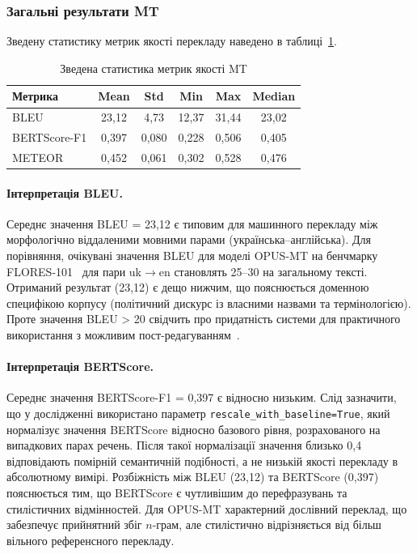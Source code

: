 \subsubsection{Загальні результати MT}

Зведену статистику метрик якості перекладу наведено в таблиці~\ref{tab:mt_summary}.

\begin{table}[H]
\centering
\caption{Зведена статистика метрик якості MT}
\label{tab:mt_summary}
\begin{tabular}{|l|c|c|c|c|c|}
\hline
\textbf{Метрика} & \textbf{Mean} & \textbf{Std} & \textbf{Min} & \textbf{Max} & \textbf{Median} \\
\hline
BLEU & 23,12 & 4,73 & 12,37 & 31,44 & 23,02 \\
BERTScore-F1 & 0,397 & 0,080 & 0,228 & 0,506 & 0,405 \\
METEOR & 0,452 & 0,061 & 0,302 & 0,528 & 0,476 \\
\hline
\end{tabular}
\end{table}

\paragraph{Інтерпретація BLEU.}
Середнє значення BLEU = 23,12 є типовим для машинного перекладу між
морфологічно віддаленими мовними парами (українська--англійська).
Для порівняння, очікувані значення BLEU для моделі OPUS-MT на бенчмарку
FLORES-101~\cite{flores} для пари uk$\to$en становлять 25--30 на
загальному тексті. Отриманий результат (23,12) є дещо нижчим, що
пояснюється доменною специфікою корпусу (політичний дискурс із
власними назвами та термінологією). Проте значення BLEU > 20 свідчить
про придатність системи для практичного використання з можливим
пост-редагуванням~\cite{post_bleu}.

\paragraph{Інтерпретація BERTScore.}
Середнє значення BERTScore-F1 = 0,397 є відносно низьким. Слід зазначити,
що у дослідженні використано параметр \texttt{rescale\_with\_baseline=True},
який нормалізує значення BERTScore відносно базового рівня, розрахованого
на випадкових парах речень. Після такої нормалізації значення близько 0,4
відповідають помірній семантичній подібності, а не низькій якості перекладу
в абсолютному вимірі. Розбіжність між BLEU (23,12) та BERTScore (0,397)
пояснюється тим, що BERTScore є чутливішим до перефразувань та
стилістичних відмінностей. Для OPUS-MT характерний дослівний переклад,
що забезпечує прийнятний збіг $n$-грам, але стилістично відрізняється
від більш вільного референсного перекладу.

